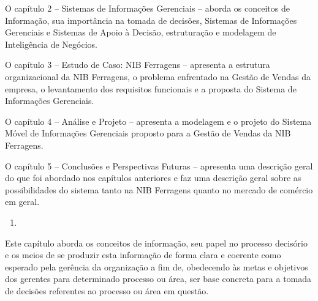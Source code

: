\documentclass[a4paper]{article}
\newcounter{saveenum}
\newcommand\liststyleWWviiiNumi{%
\renewcommand\theenumi{\arabic{enumi}}
\renewcommand\theenumii{\arabic{enumi}.\arabic{enumii}}
\renewcommand\theenumiii{\arabic{enumi}.\arabic{enumii}.\arabic{enumiii}}
\renewcommand\theenumiv{\arabic{enumi}.\arabic{enumii}.\arabic{enumiii}.\arabic{enumiv}}
\renewcommand\labelenumi{\theenumi}
\renewcommand\labelenumii{\theenumii}
\renewcommand\labelenumiii{\theenumiii}
\renewcommand\labelenumiv{\theenumiv.}
}
\begin{document}
{
\textsf{O cap\'itulo 2 -- Sistemas de Informa\c{c}\~oes Gerenciais -- aborda os conceitos de Informa\c{c}\~ao, sua
import\^ancia na tomada de decis\~oes, Sistemas de Informa\c{c}\~oes }\textsf{Gerenciais e Sistemas de Apoio \`a
Decis\~ao, estrutura\c{c}\~ao e modelagem de Intelig\^encia de Neg\'ocios.}}

{
\textsf{O cap\'itulo 3 -- Estudo de Caso: NIB Ferragens -- apresenta a estrutura organizacional da NIB Ferragens, o
problema enfrentado na Gest\~ao de Vendas da empresa, o levantamento dos requisitos funcionais e a proposta do Sistema
de Informa\c{c}\~oes Gerenciais.}}

{
\textsf{O cap\'itulo 4 -- An\'alise e Projeto -- apresenta a modelagem e o projeto do Sistema M\'ovel de
Informa\c{c}\~oes Gerenciais proposto para a Gest\~ao de Vendas da NIB Ferragens.}}

{
\textsf{O cap\'itulo 5 -- Conclus\~oes e Perspectivas Futuras -- apresenta uma descri\c{c}\~ao geral do que foi abordado
nos cap\'itulos anteriores e faz uma descri\c{c}\~ao geral sobre as possibilidades do sistema tanto na NIB Ferragens
quanto no mercado de com\'ercio em geral.}}


\bigskip


\bigskip

\liststyleWWviiiNumi
\setcounter{saveenum}{\value{enumi}}
\begin{enumerate}
\setcounter{enumi}{\value{saveenum}}
\item {}
\end{enumerate}

\bigskip

{
\textsf{Este cap\'itulo aborda os conceitos de informa\c{c}\~ao, seu papel no processo decis\'orio e os meios de se
produzir esta informa\c{c}\~ao de forma clara e coerente como esperado pela ger\^encia da organiza\c{c}\~ao a fim de,
obedecendo \`as metas e objetivos dos gerentes para determinado processo ou \'area, ser base concreta para a tomada de
decis\~oes referentes ao processo ou \'area em quest\~ao.}}


\bigskip
\end{document}
